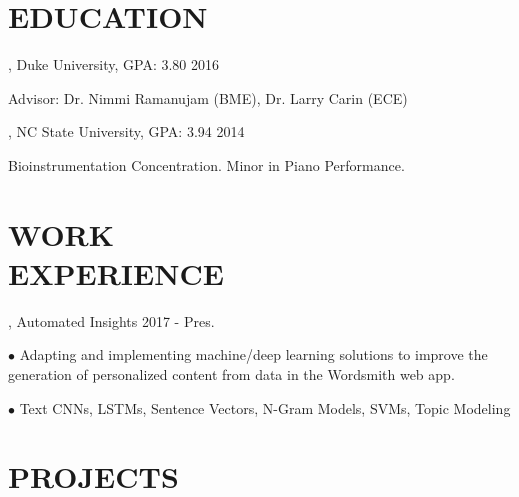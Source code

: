 \documentclass[resmargin, 11pt]{resume_style_class} %
\newenvironment{outline}
  {\begin{list}{}{\setlength{\leftmargin}{30pt}\setlength\itemsep{-2pt}}}
  {\end{list}}
\begin{document}
\begin{resume}


\section{EDUCATION}

, Duke University, GPA: 3.80 \hfill 2016
\begin{outline}
\item Advisor: Dr. Nimmi Ramanujam (BME), Dr. Larry Carin (ECE)
\end{outline}

, NC State University, GPA: 3.94 \hfill 2014
\begin{outline}
\item Bioinstrumentation Concentration. Minor in Piano Performance.
\end{outline}
 
 
 
\section{WORK \\ EXPERIENCE}
, Automated Insights \hfill 2017 - Pres.
\begin{outline}
\item[$\bullet$\hspace{0.1cm}]  Adapting and implementing machine/deep learning solutions to improve the generation of personalized content from data in the Wordsmith web app.
\item[$\bullet$\hspace{0.1cm}]  Text CNNs, LSTMs, Sentence Vectors, N-Gram Models, SVMs, Topic Modeling
\end{outline} 
 
\section{PROJECTS}


\end{resume}
\end{document}
